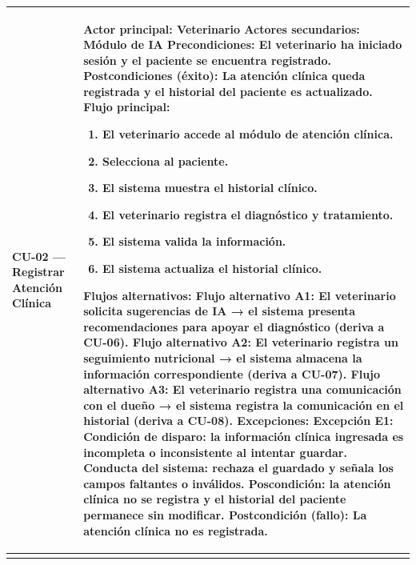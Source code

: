 \documentclass[
]{article}
\newcounter{none} %
\begin{document}
{\def\LTcaptype{none} %
\begin{longtable}[]{|
  >{\raggedright\arraybackslash}p{}|
  >{\raggedright\arraybackslash}p{}|}
\hline
\begin{minipage}[b]{\linewidth}\raggedright
\textbf{CU-02 --- Registrar Atención Clínica}
\end{minipage} & \begin{minipage}[b]{\linewidth}\raggedright
\textbf{Actor principal:} Veterinario \textbf{Actores secundarios:} Módulo de IA \textbf{Precondiciones:} El
veterinario ha iniciado sesión y el paciente se encuentra registrado. \textbf{Postcondiciones (éxito):} La atención clínica queda registrada y
el historial del paciente es actualizado. \textbf{Flujo principal:}

\begin{enumerate}
\def\labelenumi{\arabic{enumi}.}
\item
  El veterinario accede al módulo de atención clínica.
\item
  Selecciona al paciente.
\item
  El sistema muestra el historial clínico.
\item
  El veterinario registra el diagnóstico y tratamiento.
\item
  El sistema valida la información.
\item
  El sistema actualiza el historial clínico.
\end{enumerate}

\textbf{Flujos alternativos:} Flujo alternativo A1: El veterinario solicita sugerencias de IA → el sistema presenta recomendaciones para apoyar el diagnóstico (deriva a CU-06). Flujo alternativo A2: El veterinario registra un seguimiento nutricional → el sistema almacena la información correspondiente (deriva a CU-07). Flujo alternativo A3: El veterinario registra una comunicación con el dueño → el sistema registra la comunicación en el historial (deriva a CU-08).
\textbf{Excepciones:} Excepción E1: Condición de disparo: la información clínica ingresada es incompleta o inconsistente al intentar guardar. Conducta del sistema: rechaza el guardado y señala los campos faltantes o inválidos. Poscondición: la atención clínica no se registra y el historial del paciente permanece sin modificar.
\textbf{Postcondición (fallo):} La atención clínica no es registrada.
\end{minipage} \\
\hline
\endhead
\hline
\endlastfoot
\end{longtable}
}
\end{document}
